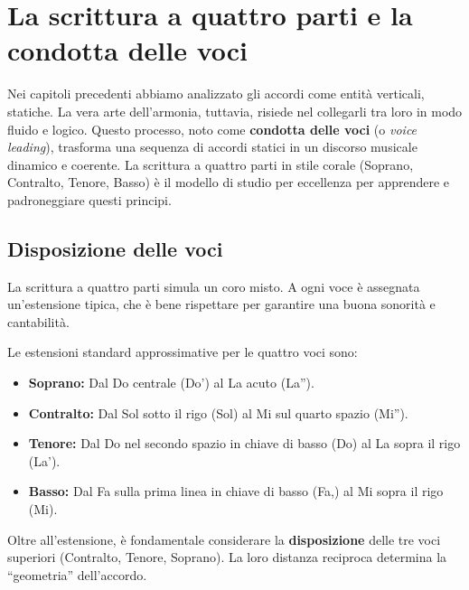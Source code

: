 \chapter{La scrittura a quattro parti e la condotta delle voci}
\label{chap:condotta_voci}

Nei capitoli precedenti abbiamo analizzato gli accordi come entità verticali, statiche. La vera arte dell'armonia, tuttavia, risiede nel collegarli tra loro in modo fluido e logico. Questo processo, noto come \textbf{condotta delle voci} (o \textit{voice leading}), trasforma una sequenza di accordi statici in un discorso musicale dinamico e coerente. La scrittura a quattro parti in stile corale (Soprano, Contralto, Tenore, Basso) è il modello di studio per eccellenza per apprendere e padroneggiare questi principi.

\section{Disposizione delle voci}
\label{sec:disposizione_voci}

La scrittura a quattro parti simula un coro misto. A ogni voce è assegnata un'estensione tipica, che è bene rispettare per garantire una buona sonorità e cantabilità.

\begin{definizione}
	\label{def:estensione_voci}
	Le estensioni standard approssimative per le quattro voci sono:
	\begin{itemize}
		\item \textbf{Soprano:} Dal Do centrale (Do') al La acuto (La'').
		\item \textbf{Contralto:} Dal Sol sotto il rigo (Sol) al Mi sul quarto spazio (Mi'').
		\item \textbf{Tenore:} Dal Do nel secondo spazio in chiave di basso (Do) al La sopra il rigo (La').
		\item \textbf{Basso:} Dal Fa sulla prima linea in chiave di basso (Fa,) al Mi sopra il rigo (Mi).
	\end{itemize}
\end{definizione}

Oltre all'estensione, è fondamentale considerare la \textbf{disposizione} delle tre voci superiori (Contralto, Tenore, Soprano). La loro distanza reciproca determina la ``geometria'' dell'accordo.

